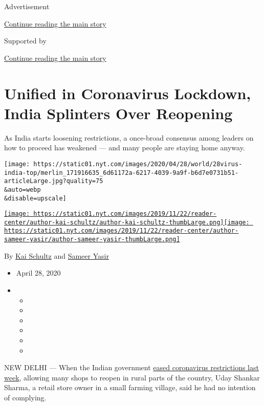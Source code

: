 Advertisement

\protect\hyperlink{after-top}{Continue reading the main story}

Supported by

\protect\hyperlink{after-sponsor}{Continue reading the main story}

\hypertarget{unified-in-coronavirus-lockdown-india-splinters-over-reopening}{%
\section{Unified in Coronavirus Lockdown, India Splinters Over
Reopening}\label{unified-in-coronavirus-lockdown-india-splinters-over-reopening}}

As India starts loosening restrictions, a once-broad consensus among
leaders on how to proceed has weakened --- and many people are staying
home anyway.

\texttt{[image: https://static01.nyt.com/images/2020/04/28/world/28virus-india-top/merlin\_171916635\_6d61172a-6217-4039-9a9f-b6d7e0731b51-articleLarge.jpg?quality=75\\\&auto=webp\\\&disable=upscale]}

\href{https://www.nytimes.com/by/kai-schultz}{\texttt{[image: https://static01.nyt.com/images/2019/11/22/reader-center/author-kai-schultz/author-kai-schultz-thumbLarge.png]}}\href{https://www.nytimes.com/by/sameer-yasir}{\texttt{[image: https://static01.nyt.com/images/2019/11/22/reader-center/author-sameer-yasir/author-sameer-yasir-thumbLarge.png]}}

By \href{https://www.nytimes.com/by/kai-schultz}{Kai Schultz} and
\href{https://www.nytimes.com/by/sameer-yasir}{Sameer Yasir}

\begin{itemize}
\item
  April 28, 2020
\item
  \begin{itemize}
  \item
  \item
  \item
  \item
  \item
  \item
  \end{itemize}
\end{itemize}

NEW DELHI --- When the Indian government
\href{https://www.business-standard.com/article/current-affairs/govt-eases-lockdown-rules-allows-all-local-and-standalone-shops-to-open-120042500051_1.html}{eased
coronavirus restrictions last week}, allowing many shops to reopen in
rural parts of the country, Uday Shankar Sharma, a retail store owner in
a small farming village, said he had no intention of complying.

